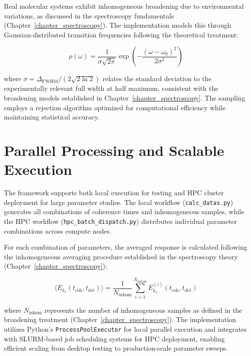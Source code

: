 \noindent
Real molecular systems exhibit inhomogeneous broadening due to environmental variations, as discussed in the spectroscopy fundamentals (Chapter~\ref{chapter_spectroscopy}). The implementation models this through Gaussian-distributed transition frequencies following the theoretical treatment:

\begin{equation}
	\label{eq:gaussian_broadening}
	\rho(\omega) = \frac{1}{\sigma\sqrt{2\pi}} \exp\left(-\frac{(\omega-\omega_0)^2}{2\sigma^2}\right)
\end{equation}

\noindent
where $\sigma = \Delta_{\text{FWHM}}/(2\sqrt{2\ln 2})$ relates the standard deviation to the experimentally relevant full width at half maximum, consistent with the broadening models established in Chapter~\ref{chapter_spectroscopy}. The sampling employs a rejection algorithm optimized for computational efficiency while maintaining statistical accuracy.

\section{Parallel Processing and Scalable Execution}
\label{sec:parallel_processing}

\noindent
The framework supports both local execution for testing and HPC cluster deployment for large parameter studies. The local workflow (\texttt{calc\_datas.py}) generates all combinations of coherence times and inhomogeneous samples, while the HPC workflow (\texttt{hpc\_batch\_dispatch.py}) distributes individual parameter combinations across compute nodes.

\noindent
For each combination of parameters, the averaged response is calculated following the inhomogeneous averaging procedure established in the spectroscopy theory (Chapter~\ref{chapter_spectroscopy}):

\begin{equation}
	\label{eq:averaged_response}
	\langle E_{k_s}(t_{\text{coh}}, t_{\text{det}}) \rangle = \frac{1}{N_{\text{inhom}}} \sum_{i=1}^{N_{\text{inhom}}} E_{k_s}^{(i)}(t_{\text{coh}}, t_{\text{det}})
\end{equation}

\noindent
where $N_{\text{inhom}}$ represents the number of inhomogeneous samples as defined in the broadening treatment (Chapter~\ref{chapter_spectroscopy}). The implementation utilizes Python's \texttt{ProcessPoolExecutor} for local parallel execution and integrates with SLURM-based job scheduling systems for HPC deployment, enabling efficient scaling from desktop testing to production-scale parameter sweeps.

